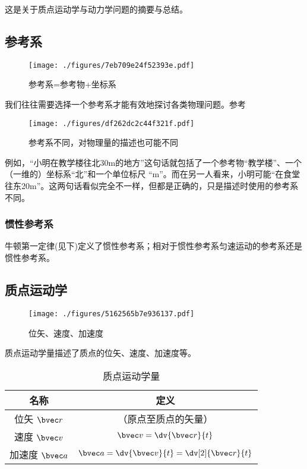 
这是关于质点运动学与动力学问题的摘要与总结。

\subsection{参考系}
\begin{figure}[ht]
\centering
\texttt{[image: ./figures/7eb709e24f52393e.pdf]}
\caption{参考系=参考物+坐标系} \label{fig_MPAB_1}
\end{figure}
我们往往需要选择一个参考系才能有效地探讨各类物理问题。参考

\begin{figure}[ht]
\centering
\texttt{[image: ./figures/df262dc2c44f321f.pdf]}
\caption{参考系不同，对物理量的描述也可能不同} \label{fig_MPAB_2}
\end{figure}
例如，“小明在教学楼往北30m的地方”这句话就包括了一个参考物“教学楼”、一个（一维的）坐标系“北”和一个单位标尺 “m”。而在另一人看来，小明可能“在食堂往东20m”。这两句话看似完全不一样，但都是正确的，只是描述时使用的参考系不同。

\subsubsection{惯性参考系}
牛顿第一定律(见下)定义了惯性参考系；相对于惯性参考系匀速运动的参考系还是惯性参考系。

\subsection{质点运动学}
\begin{figure}[ht]
\centering
\texttt{[image: ./figures/5162565b7e936137.pdf]}
\caption{位矢、速度、加速度} \label{fig_MPAB_3}
\end{figure}

质点运动学量描述了质点的位矢、速度、加速度等。
\begin{table}[ht]
\centering
\caption{质点运动学量}\label{tab_MPAB_1}
\begin{tabular}{|c|c|}
\hline
名称 & 定义 \\
\hline
位矢 $\bvec r$ & （原点至质点的矢量） \\
\hline
速度 $\bvec v$& $\bvec v = \dv{\bvec r}{t}$ \\
\hline
加速度 $\bvec a$& $\bvec a = \dv{\bvec v}{t} = \dv[2]{\bvec r}{t}$ \\
\hline
\end{tabular}
\end{table}

